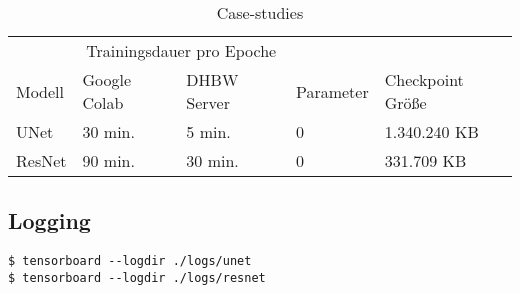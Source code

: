 \begin{table}[H]
   \centering
   \begin{tabular}{lllll}
   \toprule
   & \multicolumn{2}{c}{Trainingsdauer pro Epoche} & \\
   
   \cmidrule(r){2-3}
   
   Modell & Google Colab & DHBW Server & Parameter & Checkpoint Größe \\
   \midrule
   UNet & 30 min. & 5 min. & 0 & 1.340.240 KB \\
   ResNet & 90 min. & 30 min. & 0 & 331.709 KB \\
   \bottomrule
   \end{tabular}
   \caption{Case-studies}
   \label{case-studies}
\end{table}

\subsection{Logging}

\begin{code}
   \begin{verbatim}
$ tensorboard --logdir ./logs/unet
$ tensorboard --logdir ./logs/resnet
   \end{verbatim}
\end{code}
